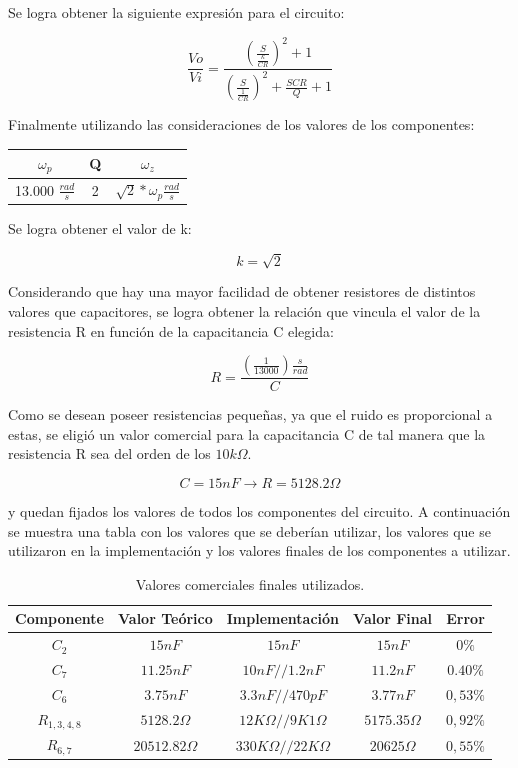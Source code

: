\documentclass[a4paper]{article}
\begin{document}
Se logra obtener la siguiente expresión para el circuito:

\begin{equation}
\frac{Vo}{Vi} = \frac{\left(\frac{S}{\frac{k}{C R}}\right)^2 + 1}{\left( \frac{S}{\frac{1}{CR}} \right)^2+\frac{SCR}{Q} + 1}
\label{circ_trans_simple}
\end{equation}

Finalmente utilizando las consideraciones de los valores de los componentes:
\begin{table}[H]
\centering
\begin{tabular}{@{}ccc@{}}
\toprule
$\omega_p$ & Q & $\omega_z$ \\ \midrule
13.000 $\frac{rad}{s}$ & 2 & $\sqrt{2}*\omega_p \frac{rad}{s}$ \\ \bottomrule
\end{tabular}
\end{table}
Se logra obtener el valor de k:

\begin{equation}
k = \sqrt{2}
\end{equation}

Considerando que hay una mayor facilidad de obtener resistores de distintos valores que capacitores, se logra obtener la relación que vincula el valor de la resistencia R en función de la capacitancia C elegida:

\begin{equation}
R = \frac{\left(\frac{1}{13000}\right) \frac{s}{rad}}{C}
\end{equation}

Como se desean poseer resistencias pequeñas, ya que el ruido es proporcional a estas, se eligió un valor comercial para la capacitancia C de tal manera que la resistencia R sea del orden de los $10k\Omega$.

$$C=15nF \rightarrow R=5128.2\Omega$$

y quedan fijados los valores de todos los componentes del circuito. A continuación se muestra una tabla con los valores que se deberían utilizar, los valores que se utilizaron en la implementación y los valores finales de los componentes a utilizar.

\begin{table}[H]
\centering
\begin{tabular}{@{}ccccc@{}}
\toprule
Componente & Valor Teórico & Implementación & Valor Final & Error \\ \midrule
$C_2$ & $15nF$ & $15nF$ & $15nF$ & $0\%$ \\
$C_7$ & $11.25nF$ & $10nF//1.2nF$ & $11.2nF$ & $0.40\%$ \\
$C_6$ & $3.75nF$ & $3.3nF//470pF$ & $3.77nF$ & $0,53\%$\\
$R_{1,3,4,8}$ & $5128.2 \Omega$ & $12K\Omega//9K1\Omega$ & $5175.35 \Omega$ & $0,92\%$ \\
$R_{6,7}$ & $20512.82 \Omega$ & $330K\Omega//22K\Omega$ & $20625\Omega$ & $0,55\%$ \\ \bottomrule
\end{tabular}
\caption{Valores comerciales finales utilizados.}
\label{Tab:valores}
\end{table}
\end{document}
